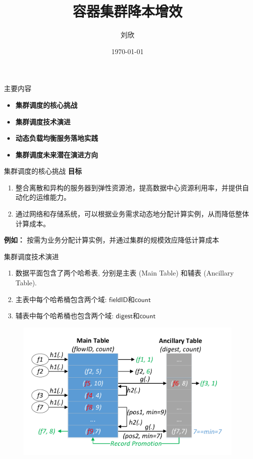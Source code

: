 \documentclass{beamer}
\title{容器集群降本增效}
\author{刘欣}
\date{\today}
\newcommand{\field}{\mathsf}
\begin{document}
{ 
\frame{\titlepage}}



\begin{frame}{主要内容}
\begin{itemize}
  \item \textbf{集群调度的核心挑战}
  \newline
  \item \textbf{集群调度技术演进}
  \newline
   \item \textbf{动态负载均衡服务落地实践}
  \newline
  \item \textbf{集群调度未来潜在演进方向}
  \newline
\end{itemize}
\end{frame}

\begin{frame}{集群调度的核心挑战}
\textbf{目标}
\begin{enumerate}
\item 整合离散和异构的服务器到弹性资源池，提高数据中心资源利用率，并提供自动化的运维能力。
\item 通过网络和存储系统，可以根据业务需求动态地分配计算实例，从而降低整体计算成本。
\end{enumerate}

\textbf{例如：} 
\newline
\setlength\parindent{24pt} \indent 按需为业务分配计算实例，并通过集群的规模效应降低计算成本

\end{frame}

\begin{frame}{集群调度技术演进}
\begin{enumerate}
\item 数据平面包含了两个哈希表, 分别是主表 (Main Table) 和辅表 (Ancillary Table).
\item 主表中每个哈希桶包含两个域: $\field{fieldID}$和$\field{count}$
\item 辅表中每个哈希桶也包含两个域: $\field{digest}$和$\field{count}$
\end{enumerate}
\begin{figure}
	\centering
	\includegraphics[width=0.6\linewidth]{figures/representation/datastructure}
\end{figure}

\end{frame}
\end{document}
